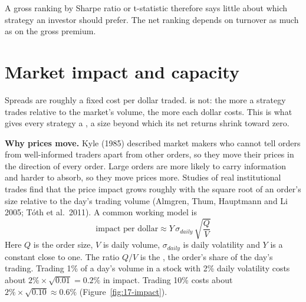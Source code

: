 
A gross ranking by Sharpe ratio or t-statistic therefore says little about which strategy an investor should prefer. The net ranking depends on turnover as much as on the gross premium.


\section{Market impact and capacity}
\label{sec:17-capacity}

Spreads are roughly a fixed cost per dollar traded.  is not: the more a strategy trades relative to the market's volume, the more each dollar costs. This is what gives every strategy a , a size beyond which its net returns shrink toward zero.

\textbf{Why prices move.} Kyle (1985) described market makers who cannot tell orders from well-informed traders apart from other orders, so they move their prices in the direction of every order. Large orders are more likely to carry information and harder to absorb, so they move prices more. Studies of real institutional trades find that the price impact grows roughly with the square root of an order's size relative to the day's trading volume (Almgren, Thum, Hauptmann and Li 2005; T\'oth et al.\ 2011). A common working model is
\begin{equation}
  \text{impact per dollar} \approx Y\,\sigma_{daily}\,\sqrt{\frac{Q}{V}}
  \label{eq:17-impact}
\end{equation}
Here $Q$ is the order size, $V$ is daily volume, $\sigma_{daily}$ is daily volatility and $Y$ is a constant close to one. The ratio $Q/V$ is the , the order's share of the day's trading. Trading 1\% of a day's volume in a stock with 2\% daily volatility costs about $2\% \times \sqrt{0.01} = 0.2\%$ in impact. Trading 10\% costs about $2\% \times \sqrt{0.10} \approx 0.6\%$ (Figure~\ref{fig:17-impact}).

